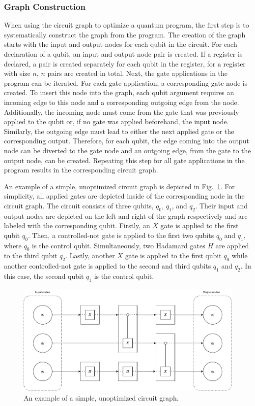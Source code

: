 \subsubsection{Graph Construction}
When using the circuit graph to optimize a quantum program, the first step is to systematically construct the graph from the program. The creation of the graph starts with the input and output nodes for each qubit in the circuit. For each declaration of a qubit, an input and output node pair is created. If a register is declared, a pair is created separately for each qubit in the register, \ie for a register with size $n$, $n$ pairs are created in total. Next, the gate applications in the program can be iterated. For each gate application, a corresponding gate node is created. To insert this node into the graph, each qubit argument requires an incoming edge to this node and a corresponding outgoing edge from the node. Additionally, the incoming node must come from the gate that was previously applied to the qubit or, if no gate was applied beforehand, the input node. Similarly, the outgoing edge must lead to either the next applied gate or the corresponding output. Therefore, for each qubit, the edge coming into the output node can be diverted to the gate node and an outgoing edge, from the gate to the output node, can be created. Repeating this step for all gate applications in the program results in the corresponding circuit graph.

An example of a simple, unoptimized circuit graph is depicted in Fig.~\ref{fig:circuit_graph_unoptimized}. For simplicity, all applied gates are depicted inside of the corresponding node in the circuit graph. The circuit consists of three qubits, $q_0$, $q_1$, and $q_2$. Their input and output nodes are depicted on the left and right of the graph respectively and are labeled with the corresponding qubit. Firstly, an $X$ gate is applied to the first qubit $q_0$. Then, a controlled-not gate is applied to the first two qubits $q_0$ and $q_1$, where $q_0$ is the control qubit. Simultaneously, two Hadamard gates $H$ are applied to the third qubit $q_2$. Lastly, another $X$ gate is applied to the first qubit $q_0$ while another controlled-not gate is applied to the second and third qubits $q_1$ and $q_2$. In this case, the second qubit $q_1$ is the control qubit.

\begin{figure}[htp]
    \centering     
    \includegraphics[width=.9\textwidth]{../figures/circuit_graph_unoptimized.pdf}
    \caption{An example of a simple, unoptimized circuit graph.}
    \label{fig:circuit_graph_unoptimized}
\end{figure}

